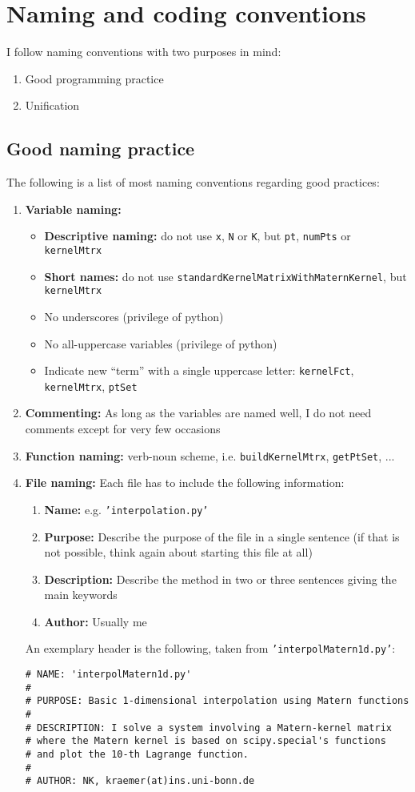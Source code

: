 \documentclass[12pt]{article}
\begin{document}
\section{Naming and coding conventions}
I follow naming conventions with two purposes in mind:
\begin{enumerate}
\item Good programming practice
\item Unification
\end{enumerate}

\subsection{Good naming practice}
The following is a list of most naming conventions regarding good practices:
\begin{enumerate}
\item \textbf{Variable naming:} 
\begin{itemize}
\item \textbf{Descriptive naming:} do not use \texttt{x}, \texttt{N} or \texttt{K}, but \texttt{pt}, \texttt{numPts} or \texttt{kernelMtrx}
\item \textbf{Short names:} do not use \texttt{standardKernelMatrixWithMaternKernel}, but \texttt{kernelMtrx}
\item No underscores (privilege of python)
\item No all-uppercase variables (privilege of python)
\item Indicate new ``term'' with a single uppercase letter: \texttt{kernelFct}, \texttt{kernelMtrx}, \texttt{ptSet}
\end{itemize}
\item \textbf{Commenting:} As long as the variables are named well, I do not need comments except for very few occasions
\item \textbf{Function naming:} verb-noun scheme, i.e. \texttt{buildKernelMtrx}, \texttt{getPtSet}, ...
\item \textbf{File naming:} Each file has to include the following information:
\begin{enumerate}
\item \textbf{Name:} e.g. \texttt{'interpolation.py'}
\item \textbf{Purpose:} Describe the purpose of the file in a single sentence (if that is not possible, think again about starting this file at all)
\item \textbf{Description:} Describe the method in two or three sentences giving the main keywords
\item \textbf{Author:} Usually me
\end{enumerate}
An exemplary header is the following, taken from \texttt{'interpolMatern1d.py'}:
\begin{Verbatim}[formatcom=\color{blue!50!black}]
# NAME: 'interpolMatern1d.py'
#
# PURPOSE: Basic 1-dimensional interpolation using Matern functions
#
# DESCRIPTION: I solve a system involving a Matern-kernel matrix 
# where the Matern kernel is based on scipy.special's functions
# and plot the 10-th Lagrange function.
#
# AUTHOR: NK, kraemer(at)ins.uni-bonn.de
\end{Verbatim}
\end{enumerate}
\end{document}
